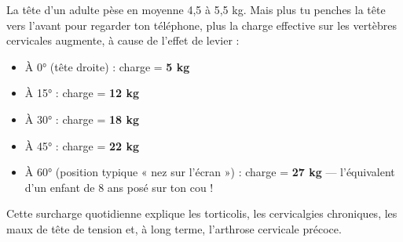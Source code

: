 \documentclass[11pt]{article}
\begin{document}
\begin{exemplebox}
La tête d'un adulte pèse en moyenne 4,5 à 5,5 kg. Mais plus tu penches la tête vers l'avant pour regarder ton téléphone, plus la charge effective sur les vertèbres cervicales augmente, à cause de l'effet de levier :
\begin{itemize}
    \item À 0° (tête droite) : charge = \textbf{5 kg}
    \item À 15° : charge = \textbf{12 kg}
    \item À 30° : charge = \textbf{18 kg}
    \item À 45° : charge = \textbf{22 kg}
    \item À 60° (position typique « nez sur l'écran ») : charge = \textbf{27 kg} — l'équivalent d'un enfant de 8 ans posé sur ton cou !
\end{itemize}
Cette surcharge quotidienne explique les torticolis, les cervicalgies chroniques, les maux de tête de tension et, à long terme, l'arthrose cervicale précoce.
\end{exemplebox}
\end{document}
